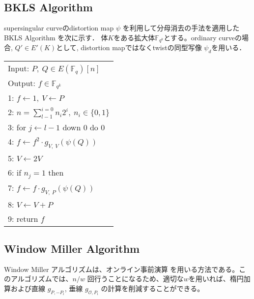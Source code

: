 \documentclass[twocolumn]{jsarticle} %
\begin{document}
\subsection{BKLS Algorithm}
 supersingular curveのdistortion map $\psi$ を利用して分母消去の手法を適用したBKLS Algorithm \cite{BKLS02}を次に示す． 体$K$をある拡大体$\mathbb{F}_{q^k}$とする。ordinary curveの場合, $Q' \in E'(K)$として, distortion mapではなくtwistの同型写像 $\psi _d$を用いる．

\begin{table}[h]
 \begin{center}
  \begin{tabular}{|l|}
     \hline
 Input: $P,\ Q \in E(\mathbb{F}_q)[n]$\\
 Output: $f \in \mathbb{F}_{q^k} $\\
     \hline
 1: \quad $f \gets 1,\ V \gets P$\\
 2: \quad $n=\sum_{l-1}^{i=0} n_i 2^i, \ n_i \in \{0,1\}$\\
 3: \quad for $j \gets l-1$ down 0 do 0\\
 4: \quad \quad $f \gets f^2 \cdot g_{V,\ V}(\psi (Q))$\\
 5: \quad \quad $V \gets 2V$\\
 6: \quad if $n_j = 1$ then\\
 7: \quad \quad $f \gets f \cdot g_{V,\ P}(\psi (Q))$\\
 8: \quad \quad $V \gets V+P$\\
 9: \quad return $f$\\
     \hline
   \end{tabular}
 \end{center}
\end{table}
\vspace{-8mm}
\par

\subsection{Window Miller Algorithm}

Window Miller アルゴリズムは、オンライン事前演算 を用いる方法である。このアルゴリズムでは、$n/w$ 回行うことになるため、適切な$w$を用いれば、楕円加算および直線 $g _{P, -P_i}$, 垂線 $g _{\mathcal{O},P_i}$ の計算を削減することができる。
\par
\end{document}
